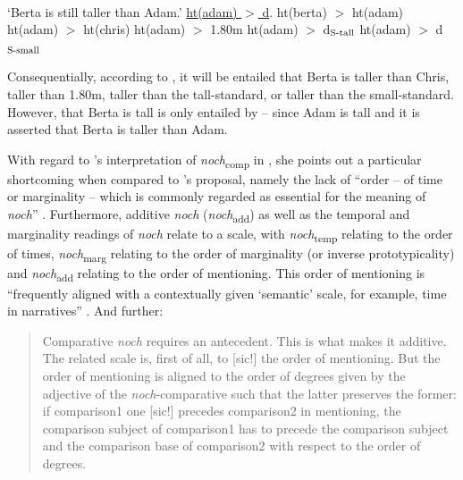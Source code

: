 \documentclass[output=paper]{langsci/langscibook}
\begin{document}
\ea \citep[ex. 25--26, emphasis in the original]{umbach2009a_comp} \ea{} \\ {`Berta is still taller than Adam.'} \label{umbach_25}
\ex    \label{umbach_repr_of_25} \uline{ht(adam) $>$ d}. ht(berta) $>$ ht(adam)
\z\ex \label{umbachs_context_degrees} \ea ht(adam) $>$ ht(chris) \label{umbach_26a}
\ex ht(adam) $>$ 1.80m                                           
\ex ht(adam) $>$ d$_{\textnormal{\scriptsize{S-tall}}}$           \label{umbach_26c}
\ex ht(adam) $>$ d$_{\textnormal{\scriptsize{S-small}}}$         
\z\z

\noindent Consequentially, according to \citeauthor{umbach2009a_comp}, it will be entailed that Berta is taller than Chris, taller than 1.80m, taller than the tall-standard, or taller than the small-standard. However, that Berta is tall is only entailed by  -- since Adam is tall and it is asserted that Berta is taller than Adam.

With regard to \citeauthor{umbach2009a_comp}'s interpretation of \textit{noch}\textsubscript{comp} in , she points out a particular shortcoming when compared to \citeauthor{koenig1977}'s \citeyearpar{koenig1977} proposal, namely the lack of ``order -- of time or marginality -- which is commonly regarded as essential for the meaning of \textit{noch}'' \citep[12]{umbach2009a_comp}. Furthermore, additive \textit{noch} (\textit{noch}\textsubscript{add}) as well as the temporal and marginality readings of \textit{noch} relate to a scale, with \textit{noch}\textsubscript{temp} relating to the order of times, \textit{noch}\textsubscript{marg} relating to the order of marginality (or inverse prototypicality) and \textit{noch}\textsubscript{add} relating to the order of mentioning. This order of mentioning is ``frequently aligned with a contextually given `semantic' scale, for example, time in narratives'' \citep[12]{umbach2009a_comp}. And further:

    \begin{quote}
    Comparative \textit{noch} requires an antecedent. This is what makes it additive. The related scale is, first of all, to [sic!] the order of mentioning. But the order of mentioning is aligned to the order of degrees given by the adjective of the \textit{noch}-comparative such that the latter preserves the former: if comparison1 one [sic!] precedes comparison2 in mentioning, the comparison subject of comparison1 has to precede the comparison subject and the comparison base of comparison2 with respect to the order of degrees.\\\hbox{}\hfill \citep[13]{umbach2009a_comp}
    \end{quote}
\end{document}
